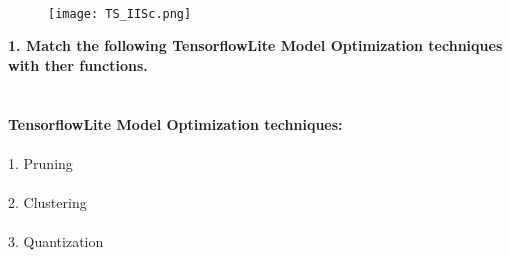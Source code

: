 \documentclass[prl,twocolumn,showpacs,preprintnumbers,superscriptaddress]{revtex4}
\theoremstyle{plain}
\theoremstyle{definition}
\begin{document}
\begin{widetext}
\\
\\
\\

\begin{wrapfigure}
\centering
\end{wrapfigure}
\begin{figure}[h!]
 \begin{right}
  \hfill\texttt{[image: TS\_IISc.png]}
 \end{right}
\end{figure}
\noindent \textbf{1. Match the following TensorflowLite Model Optimization techniques with ther functions.}
\\
\\
\\
\textbf{TensorflowLite Model Optimization techniques:}
\\
\\
1. Pruning
\\
\\
2. Clustering
\\
\\
3. Quantization
\\
\\


\end{widetext}
\end{document}
